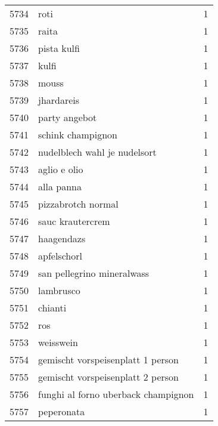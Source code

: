 \begin{tabular}{llr}
5734 &                                               roti &      1 \\
5735 &                                              raita &      1 \\
5736 &                                        pista kulfi &      1 \\
5737 &                                              kulfi &      1 \\
5738 &                                              mouss &      1 \\
5739 &                                         jhardareis &      1 \\
5740 &                                      party angebot &      1 \\
5741 &                                  schink champignon &      1 \\
5742 &                       nudelblech wahl je nudelsort &      1 \\
5743 &                                       aglio e olio &      1 \\
5744 &                                         alla panna &      1 \\
5745 &                                 pizzabrotch normal &      1 \\
5746 &                                   sauc krautercrem &      1 \\
5747 &                                         haagendazs &      1 \\
5748 &                                        apfelschorl &      1 \\
5749 &                         san pellegrino mineralwass &      1 \\
5750 &                                          lambrusco &      1 \\
5751 &                                            chianti &      1 \\
5752 &                                                ros &      1 \\
5753 &                                          weisswein &      1 \\
5754 &                  gemischt vorspeisenplatt 1 person &      1 \\
5755 &                  gemischt vorspeisenplatt 2 person &      1 \\
5756 &                funghi al forno uberback champignon &      1 \\
5757 &                                         peperonata &      1 \\

\end{tabular}
